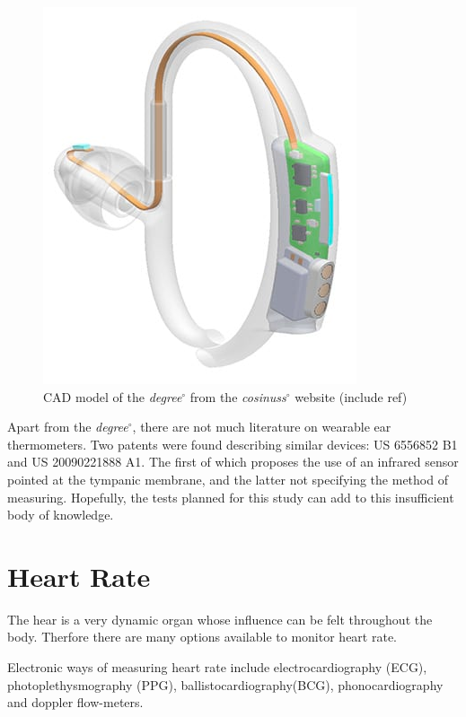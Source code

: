 \medskip

\begin{figure}[h]
   \centering
   \includegraphics[scale=0.65]{figs/Degree}
   \caption{CAD model of the \textit{degree}$^{\circ}$ from the \textit{cosinuss}$^{\circ}$ website (include ref)}
   \label{fig:Degree}
\end{figure}

Apart from the \textit{degree}$^{\circ}$, there are not much literature on wearable ear thermometers. Two patents were found describing similar devices: US 6556852 B1 and US 20090221888 A1. The first of which proposes the use of an infrared sensor pointed at the tympanic membrane, and the latter not specifying the method of measuring. Hopefully, the tests planned for this study can add to this insufficient body of knowledge.

\section{Heart Rate}
The hear is a very dynamic organ whose influence can be felt throughout the body. Therfore there are many options available to monitor heart rate.

\medskip

Electronic ways of measuring heart rate include electrocardiography (ECG), photoplethysmography (PPG), ballistocardiography(BCG), phonocardiography and doppler flow-meters.

